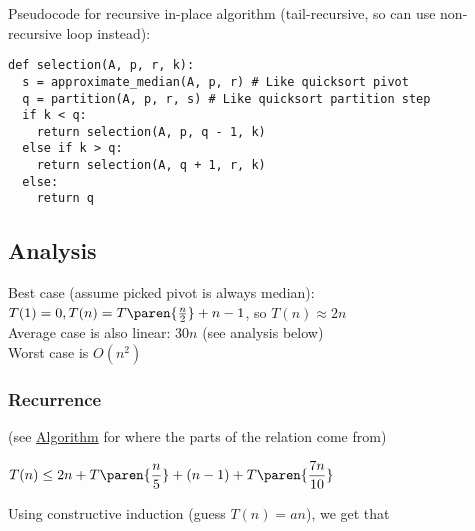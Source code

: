 Pseudocode for recursive in-place algorithm (tail-recursive, so can use non-recursive loop instead):
\begin{verbatim}
def selection(A, p, r, k):
  s = approximate_median(A, p, r) # Like quicksort pivot
  q = partition(A, p, r, s) # Like quicksort partition step
  if k < q:
    return selection(A, p, q - 1, k)
  else if k > q:
    return selection(A, q + 1, r, k)
  else:
    return q
\end{verbatim}

\subsection*{Analysis}

Best case (assume picked pivot is always median): $T(1) = 0, T(n) = T\paren{\frac n 2} + n - 1$, so \underline{$T(n) \approx 2n$}\\
Average case is also linear: $30n$ (see analysis below)\\
Worst case is $O(n^2)$

\subsubsection*{Recurrence}

(see \hyperref[subsec:Selection-Algorithm]{Algorithm} for where the parts of the relation come from)

$\displaystyle T(n) \leq 2n + T\paren{\frac n 5} + (n-1) + T\paren{\frac{7n}{10}}$

Using constructive induction (guess $T(n) = an$), we get that 
